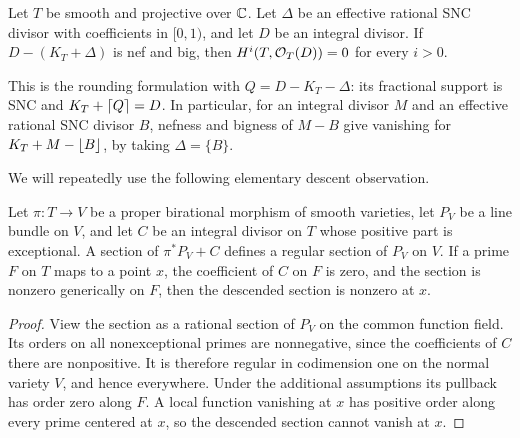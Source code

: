 \begin{theorem}\label{thm:kv}
Let $T$ be smooth and projective over $\mathbb C$. Let $\Delta$ be an
effective rational SNC divisor with coefficients in $[0,1)$, and
let $D$ be an integral divisor. If $D-(K_T+\Delta)$ is nef and big,
then $H^i(T,\mathcal O_T(D))=0$ for every $i>0$.
\end{theorem}

This is the rounding formulation with
$Q=D-K_T-\Delta$: its fractional support is SNC and
$K_T+\left\lceil Q\right\rceil=D$. In particular, for an integral divisor $M$ and an
effective rational SNC divisor $B$, nefness and bigness of $M-B$
give vanishing for $K_T+M-\left\lfloor B\right\rfloor$, by taking $\Delta=\{B\}$.

We will repeatedly use the following elementary descent observation.
\begin{lemma}\label{lem:descent}
Let $\pi:T\to V$ be a proper birational morphism of smooth varieties,
let $P_V$ be a line bundle on $V$, and let $C$ be an integral divisor
on $T$ whose positive part is exceptional. A section of
$\pi^*P_V+C$ defines a regular section of $P_V$ on $V$.
If a prime $F$ on $T$ maps to a point $x$, the coefficient of $C$
on $F$ is zero, and the section is nonzero generically on $F$, then
the descended section is nonzero at $x$.
\end{lemma}
\begin{proof}
View the section as a rational section of $P_V$ on the common
function field. Its orders on all nonexceptional primes are
nonnegative, since the coefficients of $C$ there are nonpositive.
It is therefore regular in codimension one on the normal variety
$V$, and hence everywhere. Under the additional assumptions its
pullback has order zero along $F$. A local function vanishing at
$x$ has positive order along every prime centered at $x$, so the
descended section cannot vanish at $x$.
\end{proof}
